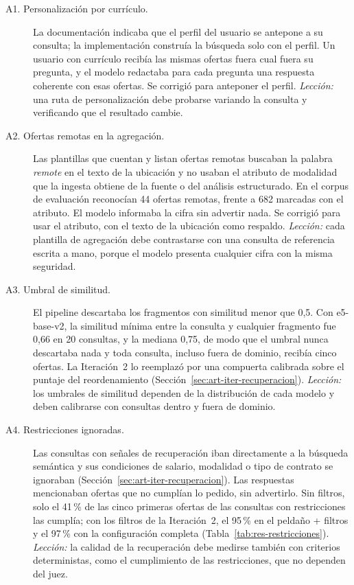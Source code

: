 \begin{description}
    \item[A1. Personalización por currículo.] La documentación indicaba que el perfil del usuario se antepone a su consulta; la implementación construía la búsqueda solo con el perfil. Un usuario con currículo recibía las mismas ofertas fuera cual fuera su pregunta, y el modelo redactaba para cada pregunta una respuesta coherente con esas ofertas. Se corrigió para anteponer el perfil. \emph{Lección:} una ruta de personalización debe probarse variando la consulta y verificando que el resultado cambie.
    \item[A2. Ofertas remotas en la agregación.] Las plantillas que cuentan y listan ofertas remotas buscaban la palabra \textit{remote} en el texto de la ubicación y no usaban el atributo de modalidad que la ingesta obtiene de la fuente o del análisis estructurado. En el corpus de evaluación reconocían 44 ofertas remotas, frente a 682 marcadas con el atributo. El modelo informaba la cifra sin advertir nada. Se corrigió para usar el atributo, con el texto de la ubicación como respaldo. \emph{Lección:} cada plantilla de agregación debe contrastarse con una consulta de referencia escrita a mano, porque el modelo presenta cualquier cifra con la misma seguridad.
    \item[A3. Umbral de similitud.] El pipeline descartaba los fragmentos con similitud menor que 0,5. Con e5-base-v2, la similitud mínima entre la consulta y cualquier fragmento fue 0,66 en 20 consultas, y la mediana 0,75, de modo que el umbral nunca descartaba nada y toda consulta, incluso fuera de dominio, recibía cinco ofertas. La Iteración~2 lo reemplazó por una compuerta calibrada sobre el puntaje del reordenamiento (Sección~\ref{sec:art-iter-recuperacion}). \emph{Lección:} los umbrales de similitud dependen de la distribución de cada modelo y deben calibrarse con consultas dentro y fuera de dominio.
    \item[A4. Restricciones ignoradas.] Las consultas con señales de recuperación iban directamente a la búsqueda semántica y sus condiciones de salario, modalidad o tipo de contrato se ignoraban (Sección~\ref{sec:art-iter-recuperacion}). Las respuestas mencionaban ofertas que no cumplían lo pedido, sin advertirlo. Sin filtros, solo el 41\,\% de las cinco primeras ofertas de las consultas con restricciones las cumplía; con los filtros de la Iteración~2, el 95\,\% en el peldaño + filtros y el 97\,\% con la configuración completa (Tabla~\ref{tab:res-restricciones}). \emph{Lección:} la calidad de la recuperación debe medirse también con criterios deterministas, como el cumplimiento de las restricciones, que no dependen del juez.

\end{description}
